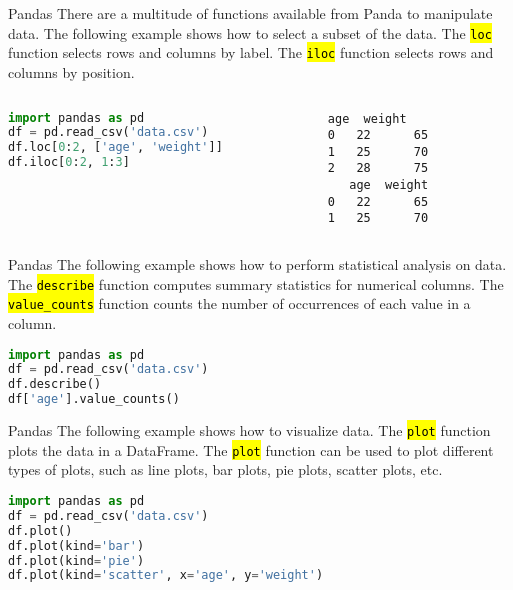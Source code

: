 \documentclass[
    aspectratio=169, 
    usepdftitle=false, 
    xcolor={dvipsnames},
    hyperref={
        colorlinks,
        linkcolor=black,
        urlcolor=blue}
    ]{beamer}
\let\OldTexttt\texttt
\renewcommand{\texttt}[1]{\OldTexttt{\hl{#1}}}%
\begin{document}
\begin{frame}[fragile]{Pandas}
    There are a multitude of functions available from Panda to manipulate data. The following example shows how to select a subset of the data. The \texttt{loc} function selects rows and columns by label. The \texttt{iloc} function selects rows and columns by position.

    \begin{columns}
        \begin{column}{0.45\textwidth}
\begin{lstlisting}[language=Python]
import pandas as pd
df = pd.read_csv('data.csv')
df.loc[0:2, ['age', 'weight']]
df.iloc[0:2, 1:3]
\end{lstlisting}
\end{column}
\begin{column}{0.45\textwidth}
\begin{lstlisting}[style=output]
   age  weight
0   22      65
1   25      70
2   28      75
   age  weight
0   22      65
1   25      70
\end{lstlisting}
\end{column}
\end{columns}
\end{frame}

\begin{frame}[fragile]{Pandas}
    The following example shows how to perform statistical analysis on data. The \texttt{describe} function computes summary statistics for numerical columns. The \texttt{value\_counts} function counts the number of occurrences of each value in a column.

\begin{lstlisting}[language=Python]
import pandas as pd
df = pd.read_csv('data.csv')
df.describe()
df['age'].value_counts()
\end{lstlisting}
\end{frame}

\begin{frame}[fragile]{Pandas}
    The following example shows how to visualize data. The \texttt{plot} function plots the data in a DataFrame. The \texttt{plot} function can be used to plot different types of plots, such as line plots, bar plots, pie plots, scatter plots, etc.

\begin{lstlisting}[language=Python]
import pandas as pd
df = pd.read_csv('data.csv')
df.plot()
df.plot(kind='bar')
df.plot(kind='pie')
df.plot(kind='scatter', x='age', y='weight')
\end{lstlisting}
\end{frame}
\end{document}
